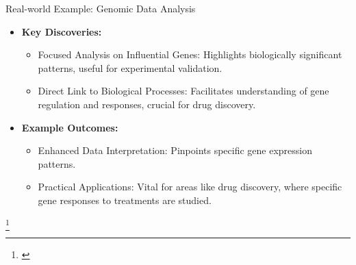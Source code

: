 \documentclass[pdf]{beamer}
\begin{document}
\begin{frame}{Real-world Example: Genomic Data Analysis}
    \begin{itemize}
        \item \textbf{Key Discoveries:}
        \begin{itemize}
            \item Focused Analysis on Influential Genes: Highlights biologically significant patterns, useful for experimental validation.
            \item Direct Link to Biological Processes: Facilitates understanding of gene regulation and responses, crucial for drug discovery.
        \end{itemize}
        \item \textbf{Example Outcomes:}
        \begin{itemize}
            \item Enhanced Data Interpretation: Pinpoints specific gene expression patterns.
            \item Practical Applications: Vital for areas like drug discovery, where specific gene responses to treatments are studied.
        \end{itemize}
    \end{itemize}
    \footnote{\cite{MahoneyDrineas2009}}
\end{frame}
\end{document}
